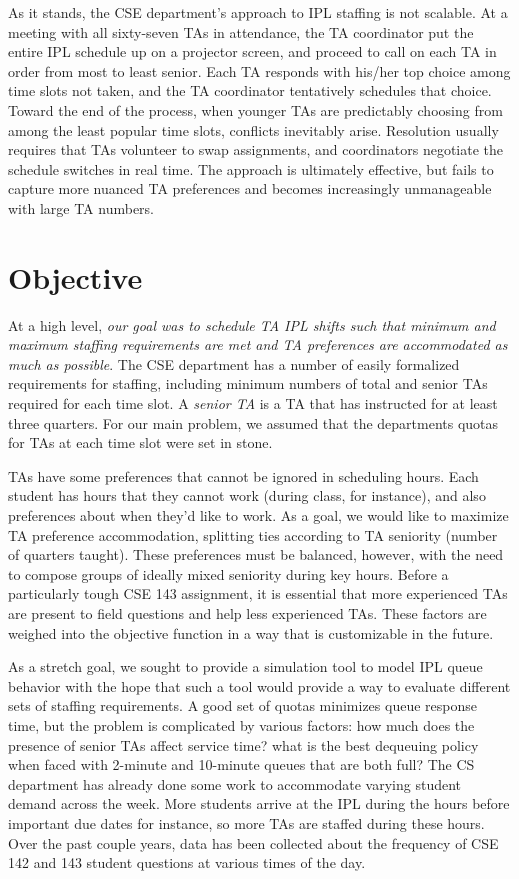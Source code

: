 \documentclass{article}
\begin{document}
\begin{multicols}{2}
As it stands, the CSE department's approach to IPL staffing is not scalable. At a meeting with all sixty-seven TAs in attendance, the TA coordinator put the entire IPL schedule up on a projector screen, and proceed to call on each TA in order from most to least senior. Each TA responds with his/her top choice among time slots not taken, and the TA coordinator tentatively schedules that choice. Toward the end of the process, when younger TAs are predictably choosing from among the least popular time slots, conflicts inevitably arise. Resolution usually requires that TAs volunteer to swap assignments, and coordinators negotiate the schedule switches in real time. The approach is ultimately effective, but fails to capture more nuanced TA preferences and becomes increasingly unmanageable with large TA numbers.

\section*{Objective}

At a high level, \textit{our goal was to schedule TA IPL shifts such that minimum and maximum staffing requirements are met and TA preferences are accommodated as much as possible}. The CSE department has a number of easily formalized requirements for staffing, including minimum numbers of total and senior TAs required for each time slot. A \textit{senior TA} is a TA that has instructed for at least three quarters. For our main problem, we assumed that the departments quotas for TAs at each time slot were set in stone.

TAs have some preferences that cannot be ignored in scheduling hours. Each student has hours that they cannot work (during class, for instance), and also preferences about when they'd like to work. As a goal, we would like to maximize TA preference accommodation, splitting ties according to TA seniority (number of quarters taught). These preferences must be balanced, however, with the need to compose groups of ideally mixed seniority during key hours. Before a particularly tough CSE 143 assignment, it is essential that more experienced TAs are present to field questions and help less experienced TAs. These factors are weighed into the objective function in a way that is customizable in the future.

As a stretch goal, we sought to provide a simulation tool to model IPL queue behavior with the hope that such a tool would provide a way to evaluate different sets of staffing requirements. A good set of quotas minimizes queue response time, but the problem is complicated by various factors: how much does the presence of senior TAs affect service time? what is the best dequeuing policy when faced with 2-minute and 10-minute queues that are both full? The CS department has already done some work to accommodate varying student demand across the week. More students arrive at the IPL during the hours before important due dates for instance, so more TAs are staffed during these hours. Over the past couple years, data has been collected about the frequency of CSE 142 and 143 student questions at various times of the day.


\end{multicols}
\end{document}
